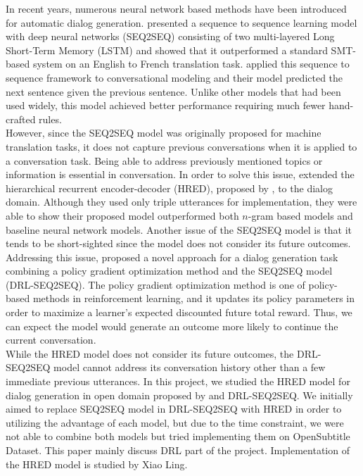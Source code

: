 In recent years, numerous neural network based methods have been introduced for automatic dialog generation. \cite{Sutskever} presented a sequence to sequence learning model with deep neural networks (SEQ2SEQ) consisting of two multi-layered Long Short-Term Memory (LSTM) and showed that it outperformed a standard SMT-based system on an English to French translation task. \cite{Vinyals} applied this sequence to sequence framework to conversational modeling and their model predicted the next sentence given the previous sentence. Unlike other models that had been used widely, this model achieved better performance requiring much fewer hand-crafted rules. \\
However, since the SEQ2SEQ model was originally proposed for machine translation tasks, it does not capture previous conversations when it is applied to a conversation task. Being able to address previously mentioned topics or information is essential in conversation. In order to solve this issue, \cite{Serban} extended the hierarchical recurrent encoder-decoder (HRED), proposed by \cite{Sordoni}, to the dialog domain. Although they used only triple utterances for implementation, they were able to show their proposed model outperformed both $n$-gram based models and baseline neural network models. Another issue of the SEQ2SEQ model is that it tends to be short-sighted since the model does not consider its future outcomes. Addressing this issue, \cite{Li} proposed a novel approach for a dialog generation task combining a policy gradient optimization method and the SEQ2SEQ model (DRL-SEQ2SEQ). The policy gradient optimization method is one of policy-based methods in reinforcement learning, and it updates its policy parameters in order to maximize a learner's expected discounted future total reward. Thus, we can expect the model would generate an outcome more likely to continue the current conversation. \\
While the HRED model does not consider its future outcomes, the DRL-SEQ2SEQ model cannot address its conversation history other than a few immediate previous utterances. In this project, we studied the HRED model for dialog generation in open domain proposed by \cite{Serban} and DRL-SEQ2SEQ. We initially aimed to replace SEQ2SEQ model in DRL-SEQ2SEQ with HRED in order to utilizing the advantage of each model, but due to the time constraint, we were not able to combine both models but tried implementing them on OpenSubtitle Dataset. This paper mainly discuss DRL part of the project. Implementation of the HRED model is studied by Xiao Ling.
